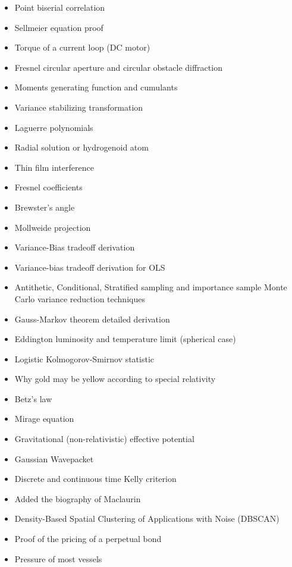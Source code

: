 \begin{itemize}
\begin{itemize}[noitemsep]
			\item Point biserial correlation
			\item Sellmeier equation  proof
			\item Torque of a current loop (DC motor)
			\item Fresnel circular aperture and circular obstacle diffraction
			\item Moments generating function and cumulants
			\item Variance stabilizing transformation
			\item Laguerre polynomials
			\item Radial solution or hydrogenoid atom
			\item Thin film interference
			\item Fresnel coefficients
			\item Brewster's angle
			\item Mollweide projection
			\item Variance-Bias tradeoff derivation
			\item Variance-bias tradeoff derivation for OLS
			\item Antithetic, Conditional, Stratified sampling and importance sample Monte Carlo variance reduction techniques
			\item Gauss-Markov theorem detailed derivation
			\item Eddington luminosity and temperature limit (spherical case)
			\item Logistic Kolmogorov-Smirnov statistic
			\item Why gold may be yellow according to special relativity
			\item Betz's law
			\item Mirage equation
			\item Gravitational (non-relativistic) effective potential
			\item Gaussian Wavepacket
			\item Discrete and continuous time Kelly criterion
			\item Added the biography of Maclaurin
			\item Density-Based Spatial Clustering of Applications with Noise (DBSCAN)
			\item Proof of the pricing of a perpetual bond
			\item Pressure of most vessels
		\end{itemize}
	\end{itemize}